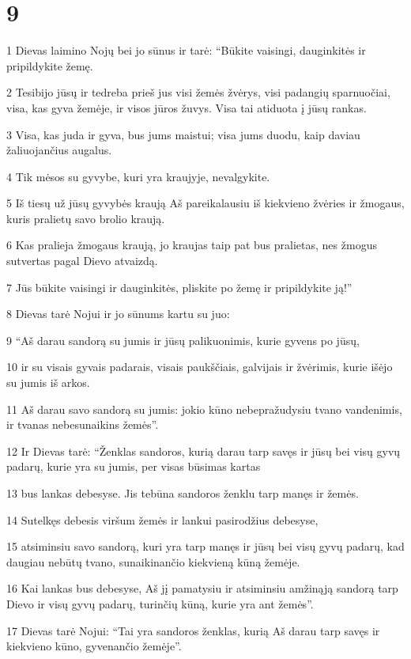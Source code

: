 \chapter{9}


\par 1 Dievas laimino Nojų bei jo sūnus ir tarė: “Būkite vaisingi, dauginkitės ir pripildykite žemę. 
\par 2 Tesibijo jūsų ir tedreba prieš jus visi žemės žvėrys, visi padangių sparnuočiai, visa, kas gyva žemėje, ir visos jūros žuvys. Visa tai atiduota į jūsų rankas. 
\par 3 Visa, kas juda ir gyva, bus jums maistui; visa jums duodu, kaip daviau žaliuojančius augalus. 
\par 4 Tik mėsos su gyvybe, kuri yra kraujyje, nevalgykite. 
\par 5 Iš tiesų už jūsų gyvybės kraują Aš pareikalausiu iš kiekvieno žvėries ir žmogaus, kuris pralietų savo brolio kraują. 
\par 6 Kas pralieja žmogaus kraują, jo kraujas taip pat bus pralietas, nes žmogus sutvertas pagal Dievo atvaizdą. 
\par 7 Jūs būkite vaisingi ir dauginkitės, pliskite po žemę ir pripildykite ją!” 
\par 8 Dievas tarė Nojui ir jo sūnums kartu su juo: 
\par 9 “Aš darau sandorą su jumis ir jūsų palikuonimis, kurie gyvens po jūsų, 
\par 10 ir su visais gyvais padarais, visais paukščiais, galvijais ir žvėrimis, kurie išėjo su jumis iš arkos. 
\par 11 Aš darau savo sandorą su jumis: jokio kūno nebepražudysiu tvano vandenimis, ir tvanas nebesunaikins žemės”. 
\par 12 Ir Dievas tarė: “Ženklas sandoros, kurią darau tarp savęs ir jūsų bei visų gyvų padarų, kurie yra su jumis, per visas būsimas kartas 
\par 13 bus lankas debesyse. Jis tebūna sandoros ženklu tarp manęs ir žemės. 
\par 14 Sutelkęs debesis viršum žemės ir lankui pasirodžius debesyse, 
\par 15 atsiminsiu savo sandorą, kuri yra tarp manęs ir jūsų bei visų gyvų padarų, kad daugiau nebūtų tvano, sunaikinančio kiekvieną kūną žemėje. 
\par 16 Kai lankas bus debesyse, Aš jį pamatysiu ir atsiminsiu amžinąją sandorą tarp Dievo ir visų gyvų padarų, turinčių kūną, kurie yra ant žemės”. 
\par 17 Dievas tarė Nojui: “Tai yra sandoros ženklas, kurią Aš darau tarp savęs ir kiekvieno kūno, gyvenančio žemėje”. 
